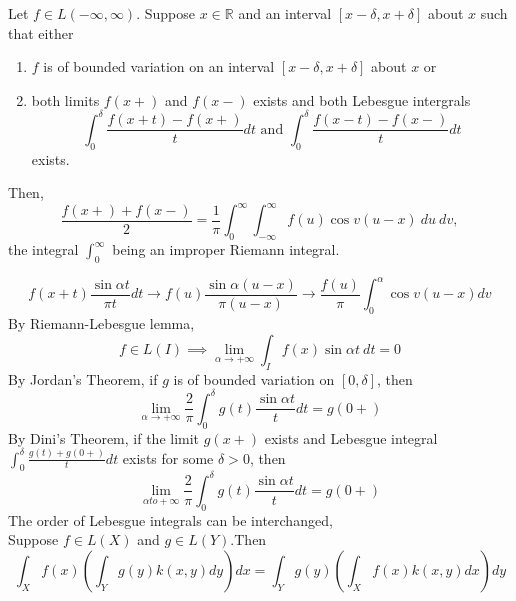 \begin{theorem}
	Let $f \in L(-\infty,\infty)$. Suppose $x \in \mathbb{R}$ and an interval $[x-\delta,x+\delta]$ about $x$ such that either 
	\begin{enumerate}
		\item $f$ is of bounded variation on an interval $[x-\delta,x+\delta]$ about $x$ or
		\item both limits $f(x+)$ and $f(x-)$ exists and both Lebesgue intergrals
			$$\int_0^\delta \frac{f(x+t)-f(x+)}{t} dt \text{ and }\int_0^\delta \frac{f(x-t)-f(x-)}{t} dt$$
			exists.
	\end{enumerate}
	Then, 
	$$\frac{f(x+)+f(x-)}{2} = \frac{1}{\pi} \int_0^\infty \int_{-\infty}^\infty f(u)\cos v(u-x)\ du\ dv,$$
	the integral $\int_0^\infty$ being an improper Riemann integral.
\end{theorem}
\begin{synopsis}
	$$f(x+t)\frac{\sin \alpha t}{\pi t} dt \to f(u)\frac{\sin \alpha(u-x)}{\pi(u-x)} \to \frac{f(u)}{\pi} \int_0^\alpha \cos v(u-x) dv$$
	By Riemann-Lebesgue lemma\cite[Theorem 11.6]{apostol},
	$$f \in L(I) \implies \lim_{\alpha \to +\infty} \int_I f(x) \sin \alpha t\ dt = 0$$
	By Jordan's Theorem\cite[Theorem 10.8]{apostol}, if $g$ is of bounded variation on $[0,\delta]$, then
	$$\lim_{\alpha \to +\infty} \frac{2}{\pi} \int_0^\delta g(t) \frac{\sin \alpha t}{t} dt = g(0+)$$
	By Dini's Theorem\cite[Theorem 10.9]{apostol}, if the limit $g(x+)$ exists and Lebesgue integral $\int_0^\delta \frac{g(t)+g(0+)}{t} dt$ exists for some $\delta > 0$, then
	$$\lim_{\alpha to +\infty} \frac{2}{\pi} \int_0^\delta g(t) \frac{\sin \alpha t}{t} dt = g(0+)$$
	The order of Lebesgue integrals can be interchanged\cite[Theorem 10.40]{apostol},\\
	Suppose $f \in L(X)$ and $g \in L(Y)$.Then\\
	$$\int_X f(x) \left(\int_Y g(y) k(x,y) dy \right) dx = \int_Y g(y) \left( \int_X f(x) k(x,y) dx \right) dy$$
\end{synopsis}
